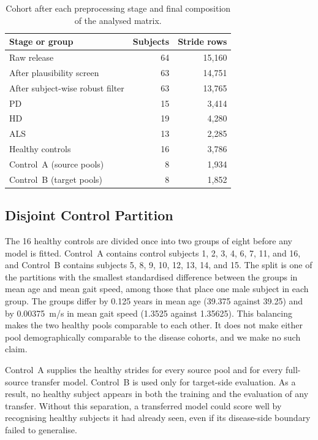 \documentclass[conference]{IEEEtran}
\begin{document}
\begin{table}[t]
\caption{Cohort after each preprocessing stage and final composition of the analysed matrix.}
\label{tab:cohort}
\centering
\footnotesize
\setlength{\tabcolsep}{4pt}
\begin{tabular}{lrr}
\toprule
Stage or group & Subjects & Stride rows \\
\midrule
Raw release & 64 & 15{,}160 \\
After plausibility screen & 63 & 14{,}751 \\
After subject-wise robust filter & 63 & 13{,}765 \\
\midrule
PD & 15 & 3{,}414 \\
HD & 19 & 4{,}280 \\
ALS & 13 & 2{,}285 \\
Healthy controls & 16 & 3{,}786 \\
\quad Control~A (source pools) & 8 & 1{,}934 \\
\quad Control~B (target pools) & 8 & 1{,}852 \\
\bottomrule
\end{tabular}
\end{table}

\subsection{Disjoint Control Partition}
\label{sec:data-partition}
The 16 healthy controls are divided once into two groups of eight before any model is fitted. Control~A contains control subjects 1, 2, 3, 4, 6, 7, 11, and 16, and Control~B contains subjects 5, 8, 9, 10, 12, 13, 14, and 15. The split is one of the partitions with the smallest standardised difference between the groups in mean age and mean gait speed, among those that place one male subject in each group. The groups differ by 0.125 years in mean age (39.375 against 39.25) and by 0.00375~m/s in mean gait speed (1.3525 against 1.35625). This balancing makes the two healthy pools comparable to each other. It does not make either pool demographically comparable to the disease cohorts, and we make no such claim.

Control~A supplies the healthy strides for every source pool and for every full-source transfer model. Control~B is used only for target-side evaluation. As a result, no healthy subject appears in both the training and the evaluation of any transfer. Without this separation, a transferred model could score well by recognising healthy subjects it had already seen, even if its disease-side boundary failed to generalise.
\end{document}
